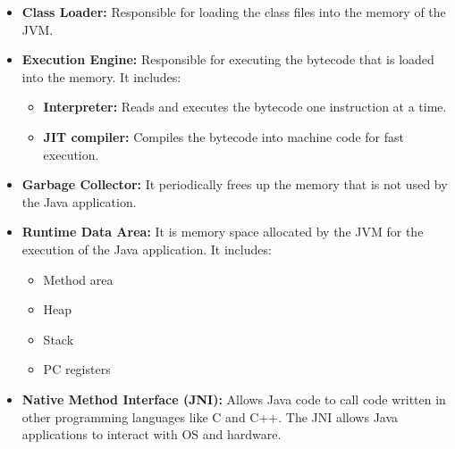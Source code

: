 \begin{flushleft}
	
	\begin{itemize}
		\item \textbf{Class Loader:} Responsible for loading the class files into the memory of the JVM.
		\item \textbf{Execution Engine:} Responsible for executing the bytecode that is loaded into the memory. It includes:
		\begin{itemize}
			\item \textbf{Interpreter:} Reads and executes the bytecode one instruction at a time. 
			\item \textbf{JIT compiler:} Compiles the bytecode into machine code for fast execution.
		\end{itemize}
		
		\item \textbf{Garbage Collector:} It periodically frees up the memory that is not used by the Java application.
		
		\item \textbf{Runtime Data Area:} It is memory space allocated by the JVM for the execution of the Java application. It includes:
		\begin{itemize}
			\item Method area
			\item Heap
			\item Stack
			\item PC registers
		\end{itemize}
		\item \textbf{Native Method Interface (JNI):} Allows Java code to call code written in other programming languages like C and C++. The JNI allows Java applications to interact with OS and hardware.
		
	\end{itemize}
	
	
\end{flushleft}

\newpage
